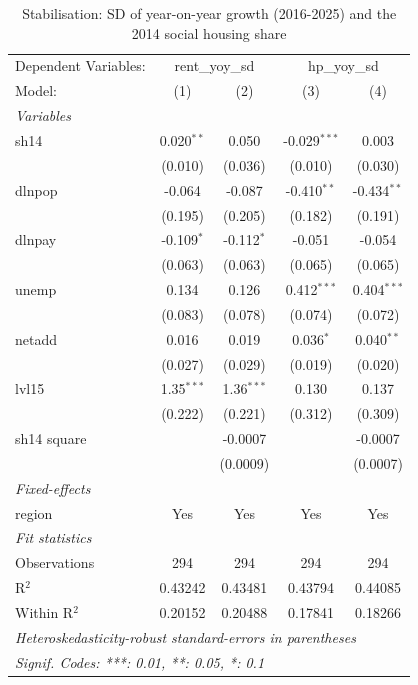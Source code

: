 
\begin{table}[htbp]
   \caption{Stabilisation: SD of year-on-year growth (2016-2025) and the 2014 social housing share}
   \centering
   \begin{tabular}{lcccc}
      \tabularnewline \midrule \midrule
      Dependent Variables: & \multicolumn{2}{c}{rent\_yoy\_sd} & \multicolumn{2}{c}{hp\_yoy\_sd}\\
      Model:       & (1)          & (2)          & (3)            & (4)\\  
      \midrule
      \emph{Variables}\\
      sh14         & 0.020$^{**}$ & 0.050        & -0.029$^{***}$ & 0.003\\   
                   & (0.010)      & (0.036)      & (0.010)        & (0.030)\\   
      dlnpop       & -0.064       & -0.087       & -0.410$^{**}$  & -0.434$^{**}$\\   
                   & (0.195)      & (0.205)      & (0.182)        & (0.191)\\   
      dlnpay       & -0.109$^{*}$ & -0.112$^{*}$ & -0.051         & -0.054\\   
                   & (0.063)      & (0.063)      & (0.065)        & (0.065)\\   
      unemp        & 0.134        & 0.126        & 0.412$^{***}$  & 0.404$^{***}$\\   
                   & (0.083)      & (0.078)      & (0.074)        & (0.072)\\   
      netadd       & 0.016        & 0.019        & 0.036$^{*}$    & 0.040$^{**}$\\   
                   & (0.027)      & (0.029)      & (0.019)        & (0.020)\\   
      lvl15        & 1.35$^{***}$ & 1.36$^{***}$ & 0.130          & 0.137\\   
                   & (0.222)      & (0.221)      & (0.312)        & (0.309)\\   
      sh14 square  &              & -0.0007      &                & -0.0007\\   
                   &              & (0.0009)     &                & (0.0007)\\   
      \midrule
      \emph{Fixed-effects}\\
      region       & Yes          & Yes          & Yes            & Yes\\  
      \midrule
      \emph{Fit statistics}\\
      Observations & 294          & 294          & 294            & 294\\  
      R$^2$        & 0.43242      & 0.43481      & 0.43794        & 0.44085\\  
      Within R$^2$ & 0.20152      & 0.20488      & 0.17841        & 0.18266\\  
      \midrule \midrule
      \multicolumn{5}{l}{\emph{Heteroskedasticity-robust standard-errors in parentheses}}\\
      \multicolumn{5}{l}{\emph{Signif. Codes: ***: 0.01, **: 0.05, *: 0.1}}\\
   \end{tabular}
\end{table}


